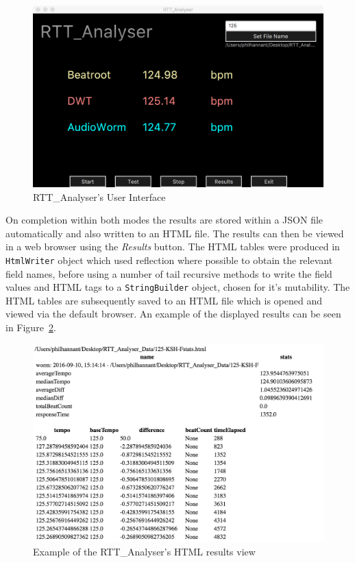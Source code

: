 \documentclass[a4paper, 11pt]{article}
\begin{document}
\begin{figure}[h]
\centering
\includegraphics[scale=0.25]{images/rtt.jpg}
\caption{RTT\_Analyser's User Interface}
\label{fig: rtt}
\end{figure}

On completion within both modes the results are stored within a JSON file automatically and also written to an HTML file. The results can then be viewed in a web browser using the \textit{Results} button. The HTML tables were produced in \texttt{HtmlWriter} object which used reflection where possible to obtain the relevant field names, before using a number of tail recursive methods to write the field values and HTML tags to a \texttt{StringBuilder} object, chosen for it's mutability. The HTML tables are subsequently saved to an HTML file which is opened and viewed via the default browser. An example of the displayed results can be seen in Figure~\ref{fig: htmlView}.

\begin{figure}[ht]
\centering
\includegraphics[scale=0.2]{images/htmlResults.jpg}
\caption{Example of the RTT\_Analyser's HTML results view}
\label{fig: htmlView}
\end{figure}
\end{document}
